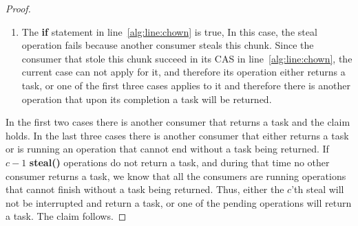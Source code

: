 \begin{proof}
\begin{enumerate}
 \item The {\bf if} statement in line~\ref{alg:line:chown} is true, In this case, the steal operation fails because another consumer steals this chunk. Since the consumer that stole this chunk succeed in its CAS in line~\ref{alg:line:chown}, the current case can not apply for it, and therefore its operation either returns a task, or one of the first three  cases applies to it and therefore there is another operation that upon its completion a task will be returned. 
\end{enumerate}
In the first two cases there is another consumer that returns a task and the claim holds. In the last three cases there is another consumer that either returns a task or is running an operation that cannot end without a task being returned. If $c-1$ {\bf steal()} operations do not return a task, and during that time no other consumer returns a task, we know that all the consumers are running operations that cannot finish without a task being returned. Thus, either the $c$'th steal will not be interrupted and return a task, or one of the pending operations will return a task. The claim follows.
\end{proof}